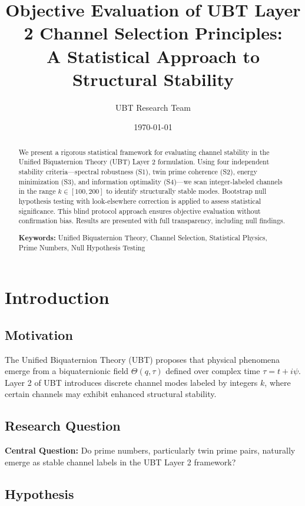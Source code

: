 \documentclass[11pt,a4paper]{article}
\title{Objective Evaluation of UBT Layer 2 Channel Selection Principles:\\
A Statistical Approach to Structural Stability}
\author{UBT Research Team}
\date{\today}
\begin{document}
\maketitle

\begin{abstract}
We present a rigorous statistical framework for evaluating channel stability in the Unified Biquaternion Theory (UBT) Layer 2 formulation. Using four independent stability criteria---spectral robustness (S1), twin prime coherence (S2), energy minimization (S3), and information optimality (S4)---we scan integer-labeled channels in the range $k \in [100, 200]$ to identify structurally stable modes. Bootstrap null hypothesis testing with look-elsewhere correction is applied to assess statistical significance. This blind protocol approach ensures objective evaluation without confirmation bias. Results are presented with full transparency, including null findings.

\textbf{Keywords:} Unified Biquaternion Theory, Channel Selection, Statistical Physics, Prime Numbers, Null Hypothesis Testing
\end{abstract}

\tableofcontents

\section{Introduction}

\subsection{Motivation}

The Unified Biquaternion Theory (UBT) proposes that physical phenomena emerge from a biquaternionic field $\Theta(q, \tau)$ defined over complex time $\tau = t + i\psi$. Layer 2 of UBT introduces discrete channel modes labeled by integers $k$, where certain channels may exhibit enhanced structural stability.

\subsection{Research Question}

\textbf{Central Question:} Do prime numbers, particularly twin prime pairs, naturally emerge as stable channel labels in the UBT Layer 2 framework?

\subsection{Hypothesis}
\end{document}
